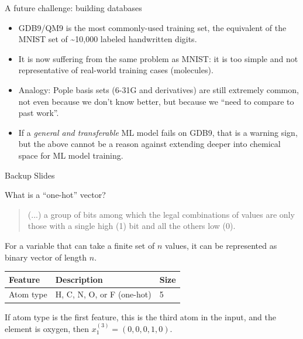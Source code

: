 \documentclass[xetex,compress]{beamer}
\begin{document}
\begin{frame}{A future challenge: building databases}
  \begin{itemize}
  \item GDB9/QM9 is the most commonly-used training set, the equivalent of the MNIST set of \textasciitilde{}10,000 labeled handwritten digits.
  \item It is now suffering from the same problem as MNIST: it is too simple and not representative of real-world training cases (molecules).
  \item Analogy: Pople basis sets (6-31G and derivatives) are still extremely common, not even because we don't know better, but because we ``need to compare to past work''.
  \item If a \emph{general and transferable} ML model fails on GDB9, that is a warning sign, but the above cannot be a reason against extending deeper into chemical space for ML model training.
  \end{itemize}
\end{frame}

\begin{frame}{Backup Slides}
\end{frame}

\begin{frame}{What is a ``one-hot'' vector?}
  \begin{quote}
    (...) a group of bits among which the legal combinations of values are only those with a single high (1) bit and all the others low (0).
  \end{quote}
  For a variable that can take a finite set of \(n\) values, it can be represented as binary vector of length \(n\).
  \begin{table}[htbp]
    \centering
    \begin{tabular}{@{}lll@{}}
      \toprule
      Feature & Description & Size \\ \midrule
      Atom type & H, C, N, O, or F (one-hot) & 5 \\ \bottomrule
    \end{tabular}
  \end{table}
  If atom type is the first feature, this is the third atom in the input, and the element is oxygen, then \(x_{1}^{(3)} = (0, 0, 0, 1, 0)\).
\end{frame}
\end{document}
